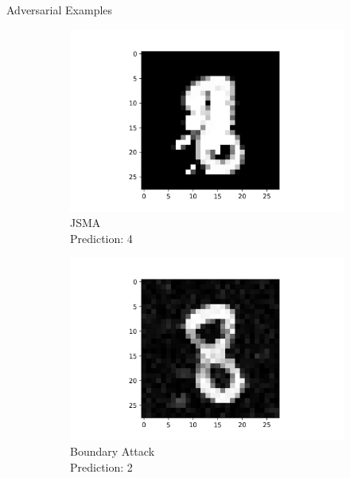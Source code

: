 \documentclass[9pt]{beamer}
\begin{document}
\begin{frame}{Adversarial Examples}
\begin{figure}
\begin{subfigure}[t]{0.24\linewidth}
        \includegraphics[width=\linewidth]{images/JSMA_4.png}
        \caption{JSMA\\Prediction: 4}
    \end{subfigure}
    \begin{subfigure}[t]{0.24\linewidth}
        \centering
        \captionsetup{justification=centering}
        \includegraphics[width=\linewidth]{images/BoundaryAttack_3.png}
        \caption{Boundary Attack\\Prediction: 2}
    \end{subfigure}
    \begin{subfigure}[t]{0.24\linewidth}
        \centering
        \captionsetup{justification=centering}

\end{subfigure}
\end{figure}
\end{frame}
\end{document}
